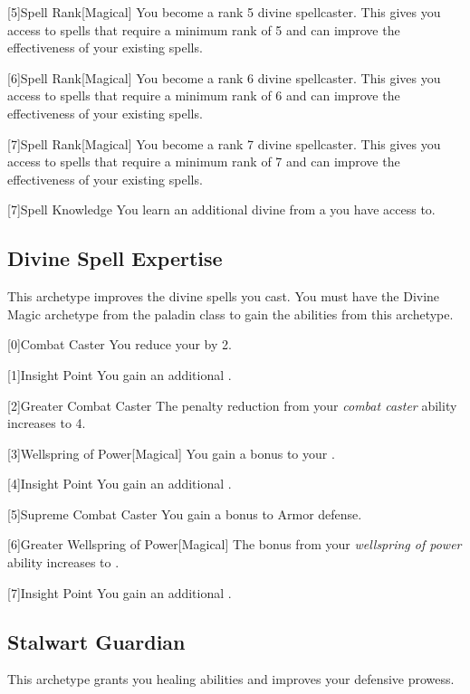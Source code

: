         [5]{Spell Rank}[Magical] You become a rank 5 divine spellcaster.
        This gives you access to spells that require a minimum rank of 5 and can improve the effectiveness of your existing spells.

        [6]{Spell Rank}[Magical] You become a rank 6 divine spellcaster.
        This gives you access to spells that require a minimum rank of 6 and can improve the effectiveness of your existing spells.

        [7]{Spell Rank}[Magical] You become a rank 7 divine spellcaster.
        This gives you access to spells that require a minimum rank of 7 and can improve the effectiveness of your existing spells.

        [7]{Spell Knowledge} You learn an additional divine  from a  you have access to.

    \newpage
    \subsection{Divine Spell Expertise}
        This archetype improves the divine spells you cast.
        You must have the Divine Magic archetype from the paladin class to gain the abilities from this archetype.

        [0]{Combat Caster} You reduce your  by 2.

        [1]{Insight Point} You gain an additional .

        [2]{Greater Combat Caster} The penalty reduction from your \textit{combat caster} ability increases to 4.

        [3]{Wellspring of Power}[Magical]
        You gain a  bonus to your  .

        [4]{Insight Point} You gain an additional .

        [5]{Supreme Combat Caster} You gain a  bonus to Armor defense.

        [6]{Greater Wellspring of Power}[Magical]
        The bonus from your \textit{wellspring of power} ability increases to .

        [7]{Insight Point} You gain an additional .

    \newpage
    \subsection{Stalwart Guardian}
        This archetype grants you healing abilities and improves your defensive prowess.

